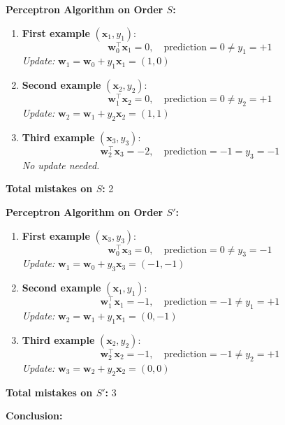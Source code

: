 \documentclass{article}
\begin{document}
\bigskip

\textbf{Perceptron Algorithm on Order \( S \):}

\begin{enumerate}
    \item \textbf{First example} \((\mathbf{x}_1, y_1)\):
    \[
    \mathbf{w}_0^\top \mathbf{x}_1 = 0,\quad \text{prediction} = 0 \neq y_1 = +1
    \]
    \textit{Update:} \( \mathbf{w}_1 = \mathbf{w}_0 + y_1 \mathbf{x}_1 = (1, 0) \)

    \item \textbf{Second example} \((\mathbf{x}_2, y_2)\):
    \[
    \mathbf{w}_1^\top \mathbf{x}_2 = 0,\quad \text{prediction} = 0 \neq y_2 = +1
    \]
    \textit{Update:} \( \mathbf{w}_2 = \mathbf{w}_1 + y_2 \mathbf{x}_2 = (1, 1) \)

    \item \textbf{Third example} \((\mathbf{x}_3, y_3)\):
    \[
    \mathbf{w}_2^\top \mathbf{x}_3 = -2,\quad \text{prediction} = -1 = y_3 = -1
    \]
    \textit{No update needed.}
\end{enumerate}

\textbf{Total mistakes on \( S \):} 2

\bigskip

\textbf{Perceptron Algorithm on Order \( S' \):}

\begin{enumerate}
    \item \textbf{First example} \((\mathbf{x}_3, y_3)\):
    \[
    \mathbf{w}_0^\top \mathbf{x}_3 = 0,\quad \text{prediction} = 0 \neq y_3 = -1
    \]
    \textit{Update:} \( \mathbf{w}_1 = \mathbf{w}_0 + y_3 \mathbf{x}_3 = (-1, -1) \)

    \item \textbf{Second example} \((\mathbf{x}_1, y_1)\):
    \[
    \mathbf{w}_1^\top \mathbf{x}_1 = -1,\quad \text{prediction} = -1 \neq y_1 = +1
    \]
    \textit{Update:} \( \mathbf{w}_2 = \mathbf{w}_1 + y_1 \mathbf{x}_1 = (0, -1) \)

    \item \textbf{Third example} \((\mathbf{x}_2, y_2)\):
    \[
    \mathbf{w}_2^\top \mathbf{x}_2 = -1,\quad \text{prediction} = -1 \neq y_2 = +1
    \]
    \textit{Update:} \( \mathbf{w}_3 = \mathbf{w}_2 + y_2 \mathbf{x}_2 = (0, 0) \)
\end{enumerate}

\textbf{Total mistakes on \( S' \):} 3

\bigskip

\textbf{Conclusion:}
\end{document}
